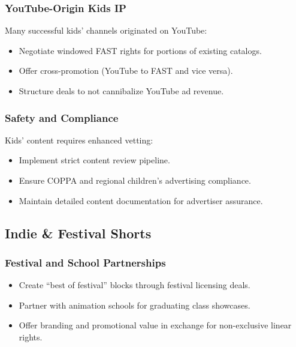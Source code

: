 \documentclass[12pt,letterpaper,twoside]{report}
\begin{document}
\subsubsection{YouTube-Origin Kids IP}

Many successful kids' channels originated on YouTube:

\begin{itemize}[leftmargin=1.5cm]
    \item Negotiate windowed FAST rights for portions of existing catalogs.
    \item Offer cross-promotion (YouTube to FAST and vice versa).
    \item Structure deals to not cannibalize YouTube ad revenue.
\end{itemize}

\subsubsection{Safety and Compliance}

Kids' content requires enhanced vetting:

\begin{itemize}[leftmargin=1.5cm]
    \item Implement strict content review pipeline.
    \item Ensure COPPA and regional children's advertising compliance.
    \item Maintain detailed content documentation for advertiser assurance.
\end{itemize}

\subsection{Indie \& Festival Shorts}

\subsubsection{Festival and School Partnerships}

\begin{itemize}[leftmargin=1.5cm]
    \item Create ``best of festival'' blocks through festival licensing deals.
    \item Partner with animation schools for graduating class showcases.
    \item Offer branding and promotional value in exchange for non-exclusive linear rights.
\end{itemize}
\end{document}
